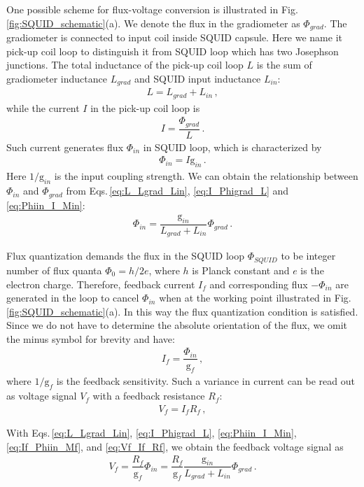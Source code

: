 One possible scheme for flux-voltage conversion is illustrated in Fig.\,\ref{fig:SQUID_schematic}(a). 
We denote the flux in the gradiometer as $\Phi_{grad}$. The gradiometer is connected to input coil inside SQUID capsule. Here we name it pick-up coil loop to distinguish it from SQUID loop which has two Josephson junctions. 
The total inductance of the pick-up coil loop $L$ is the sum of gradiometer inductance $L_{grad}$ and SQUID input inductance $L_{in}$:
\begin{align}
    L = L_{grad} + L_{in}\,,\label{eq:L_Lgrad_Lin}
\end{align}
while the current $I$ in the pick-up coil loop is
\begin{align}
	I = \dfrac{\Phi_{grad}}{L}\,.\label{eq:I_Phigrad_L}
\end{align}
Such current generates flux $\Phi_{in}$ in SQUID loop, which is characterized by 
\begin{align}
	\Phi_{in} = I \mathrm{g}_{in}\,.\label{eq:Phiin_I_Min}
\end{align}
Here $1/\mathrm{g}_{in}$ is the input coupling strength. We can obtain the relationship between $\Phi_{in}$ and $\Phi_{grad}$ from Eqs.\,\eqref{eq:L_Lgrad_Lin}, \eqref{eq:I_Phigrad_L} and \eqref{eq:Phiin_I_Min}:
\begin{align}
	\Phi_{in} = \dfrac{\mathrm{g}_{in}}{L_{grad} + L_{in}}\Phi_{grad}\,.\label{eq:Phiin_Phigrad}
\end{align}

Flux quantization demands the flux in the SQUID loop $\Phi_{SQUID}$ to be integer number of flux quanta $\Phi_0 = h/2e$, where $h$ is Planck constant and $e$ is the electron charge. Therefore, feedback current $I_f$ and corresponding flux $-\Phi_{in}$ are generated in the loop to cancel $\Phi_{in}$ when at the working point illustrated in Fig.\,\ref{fig:SQUID_schematic}(a). In this way the flux quantization condition is satisfied. 
Since we do not have to determine the absolute orientation of the flux, we omit the minus symbol for brevity and have:
\begin{align}
	I_f = \dfrac{\Phi_{in}}{\mathrm{g}_{f}} \,, \label{eq:If_Phiin_Mf}
\end{align}
where $1/\mathrm{g}_{f}$ is the feedback sensitivity. Such a variance in current can be read out as voltage signal $V_f$ with a feedback resistance $R_f$:
\begin{align}
	V_f = I_f R_f\,, \label{eq:Vf_If_Rf}
\end{align}

 With Eqs.\,\eqref{eq:L_Lgrad_Lin}, \eqref{eq:I_Phigrad_L}, \eqref{eq:Phiin_I_Min}, \eqref{eq:If_Phiin_Mf}, and \eqref{eq:Vf_If_Rf}, we obtain the feedback voltage signal as
\begin{align}
	V_f =\dfrac{ R_f}{ \mathrm{g}_{f} }  \Phi_{in} = \dfrac{ R_f}{\mathrm{g}_{f} } \dfrac{\mathrm{g}_{in}}{L_{grad} + L_{in}}\Phi_{grad} \,.\label{eq:Vf_Phigrad}
\end{align}

